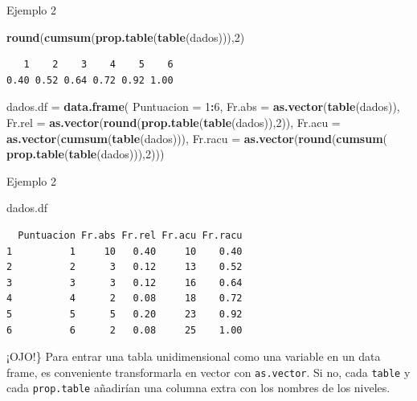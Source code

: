 \documentclass[
  ignorenonframetext,
]{beamer}
\newenvironment{Shaded}{\begin{snugshade}}{\end{snugshade}}
\newcommand{\AttributeTok}[1]{\textcolor[rgb]{0.13,0.29,0.53}{#1}}
\newcommand{\DecValTok}[1]{\textcolor[rgb]{0.00,0.00,0.81}{#1}}
\newcommand{\FunctionTok}[1]{\textcolor[rgb]{0.13,0.29,0.53}{\textbf{#1}}}
\newcommand{\NormalTok}[1]{#1}
\newcommand{\OtherTok}[1]{\textcolor[rgb]{0.56,0.35,0.01}{#1}}
\newcommand{\SpecialCharTok}[1]{\textcolor[rgb]{0.81,0.36,0.00}{\textbf{#1}}}
\begin{document}
\begin{frame}[fragile]{Ejemplo 2}
\label{ejemplo-2-6}
\begin{Shaded}
\begin{Highlighting}[]
\FunctionTok{round}\NormalTok{(}\FunctionTok{cumsum}\NormalTok{(}\FunctionTok{prop.table}\NormalTok{(}\FunctionTok{table}\NormalTok{(dados))),}\DecValTok{2}\NormalTok{)}
\end{Highlighting}
\end{Shaded}

\begin{verbatim}
   1    2    3    4    5    6 
0.40 0.52 0.64 0.72 0.92 1.00 
\end{verbatim}

\begin{Shaded}
\begin{Highlighting}[]
\NormalTok{dados.df }\OtherTok{=} \FunctionTok{data.frame}\NormalTok{(}
  \AttributeTok{Puntuacion =} \DecValTok{1}\SpecialCharTok{:}\DecValTok{6}\NormalTok{,}
  \AttributeTok{Fr.abs =} \FunctionTok{as.vector}\NormalTok{(}\FunctionTok{table}\NormalTok{(dados)),}
  \AttributeTok{Fr.rel =} \FunctionTok{as.vector}\NormalTok{(}\FunctionTok{round}\NormalTok{(}\FunctionTok{prop.table}\NormalTok{(}\FunctionTok{table}\NormalTok{(dados)),}\DecValTok{2}\NormalTok{)),}
  \AttributeTok{Fr.acu =} \FunctionTok{as.vector}\NormalTok{(}\FunctionTok{cumsum}\NormalTok{(}\FunctionTok{table}\NormalTok{(dados))),}
  \AttributeTok{Fr.racu =} \FunctionTok{as.vector}\NormalTok{(}\FunctionTok{round}\NormalTok{(}\FunctionTok{cumsum}\NormalTok{(}
    \FunctionTok{prop.table}\NormalTok{(}\FunctionTok{table}\NormalTok{(dados))),}\DecValTok{2}\NormalTok{)))}
\end{Highlighting}
\end{Shaded}
\end{frame}

\begin{frame}[fragile]{Ejemplo 2}
\label{ejemplo-2-7}
\begin{Shaded}
\begin{Highlighting}[]
\NormalTok{dados.df}
\end{Highlighting}
\end{Shaded}

\begin{verbatim}
  Puntuacion Fr.abs Fr.rel Fr.acu Fr.racu
1          1     10   0.40     10    0.40
2          2      3   0.12     13    0.52
3          3      3   0.12     16    0.64
4          4      2   0.08     18    0.72
5          5      5   0.20     23    0.92
6          6      2   0.08     25    1.00
\end{verbatim}

¡OJO!\} Para entrar una tabla unidimensional como una variable en un
data frame, es conveniente transformarla en vector con
\texttt{as.vector}. Si no, cada \texttt{table} y cada
\texttt{prop.table} añadirían una columna extra con los nombres de los
niveles.
\end{frame}
\end{document}
